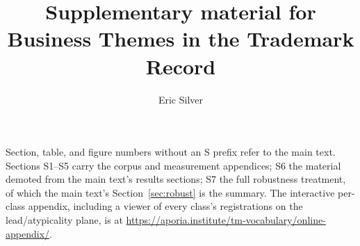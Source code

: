 
\graphicspath{{../}}
\makeatletter{}\makeatother
\usepackage{xr}

\renewcommand{\thesection}{S\arabic{section}}
\setcounter{secnumdepth}{2}
\renewcommand{\thetable}{S\arabic{table}}
\renewcommand{\thefigure}{S\arabic{figure}}

\title{\bfseries Supplementary material for\\
\large Business Themes in the Trademark Record}
\author{Eric Silver}
\date{}


\maketitle

\noindent Section, table, and figure numbers without an S prefix refer to
the main text. Sections S1--S5 carry the corpus and measurement
appendices; S6 the material demoted from the main text's results
sections; S7 the full robustness treatment, of which the main text's
Section~\ref{sec:robust} is the summary. The interactive per-class
appendix, including a viewer of every class's registrations on the
lead/atypicality plane, is at
\url{https://aporia.institute/tm-vocabulary/online-appendix/}.







